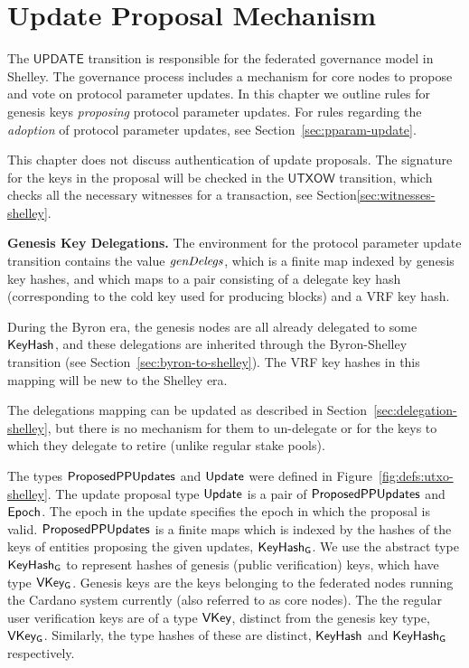 \section{Update Proposal Mechanism}
\label{sec:update}


The $\mathsf{UPDATE}$ transition is responsible for the federated governance model in Shelley.
The governance process includes a mechanism for core nodes to propose and vote on
protocol parameter updates. In this chapter we
outline rules for genesis keys \textit{proposing} protocol parameter updates.
For rules regarding the \textit{adoption} of protocol
parameter updates, see Section~\ref{sec:pparam-update}.

This chapter does not discuss authentication of update proposals.
The signature for the keys in the proposal will be checked in the
$\mathsf{UTXOW}$ transition, which checks all the necessary witnesses
for a transaction, see Section\ref{sec:witnesses-shelley}.

\textbf{Genesis Key Delegations.} The environment for the protocol parameter
update transition contains the value $\mathit{genDelegs}$,
which is a finite map indexed by genesis key hashes,
and which maps to a pair consisting of a delegate key hash
(corresponding to the cold key used for producing blocks) and
a VRF key hash.

During the Byron era, the genesis nodes are all
already delegated to some $\mathsf{KeyHash}$, and these delegations are inherited
through the Byron-Shelley transition (see Section~\ref{sec:byron-to-shelley}).
The VRF key hashes in this mapping will be new to the Shelley era.

The delegations mapping can be updated as described in
Section~\ref{sec:delegation-shelley},
but there is no mechanism for them to un-delegate or for the keys to which they delegate
to retire (unlike regular stake pools).

The types $\mathsf{ProposedPPUpdates}$ and $\mathsf{Update}$ were defined in
Figure~\ref{fig:defs:utxo-shelley}.
The update proposal type $\mathsf{Update}$ is a pair of $\mathsf{ProposedPPUpdates}$ and $\mathsf{Epoch}$.
The epoch in the update specifies the epoch in which the proposal is valid.
$\mathsf{ProposedPPUpdates}$ is a finite maps which is indexed by the hashes of the keys of
entities proposing the given updates, $\mathsf{KeyHash_G}$.
We use the abstract type $\mathsf{KeyHash_G}$ to represent hashes of genesis
(public verification) keys, which have type $\mathsf{VKey_G}$.
Genesis keys are the keys belonging to the federated
nodes running the Cardano system currently (also referred to as core nodes).
The the regular user verification keys are of a type $\mathsf{VKey}$, distinct from the
genesis key type, $\mathsf{VKey_G}$. Similarly, the type hashes of these
are distinct, $\mathsf{KeyHash}$ and $\mathsf{KeyHash_G}$ respectively.

